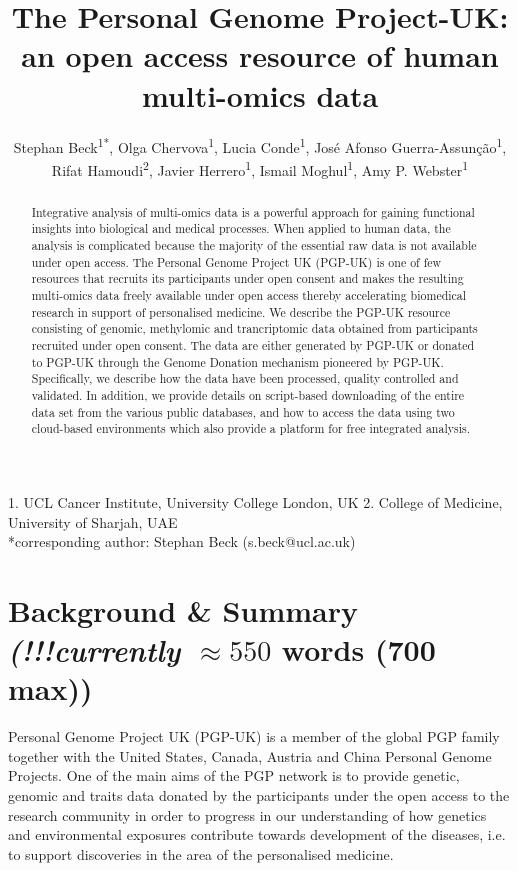 \documentclass[english]{article}
\begin{document}
\title{The Personal Genome Project-UK: an open access resource of human multi-omics data}
\author{Stephan Beck\textsuperscript{1{*}}, Olga Chervova\textsuperscript{1}, Lucia Conde\textsuperscript{1},
José Afonso Guerra-Assunção\textsuperscript{1},\\ Rifat Hamoudi\textsuperscript{2}, Javier Herrero\textsuperscript{1}, Ismail Moghul\textsuperscript{1}, Amy P. Webster\textsuperscript{1}}
\maketitle
\thispagestyle{fancy}
1. UCL Cancer Institute, University College London, UK 2. College of Medicine, University of Sharjah, UAE\\
{*}corresponding author: Stephan Beck (s.beck@ucl.ac.uk)
\begin{abstract}
Integrative analysis of multi-omics data is a powerful approach for gaining functional insights into biological and medical processes. When applied to human data, the analysis is complicated because the majority of the essential raw data is not available under open access. The Personal Genome Project UK (PGP-UK) is one of few resources that recruits its participants under open consent and makes the resulting multi-omics data freely available under open access thereby accelerating biomedical research in support of personalised medicine. We describe the PGP-UK resource consisting of genomic, methylomic and trancriptomic data obtained from participants recruited under open consent. The data are either generated by PGP-UK or donated to PGP-UK through the Genome Donation mechanism pioneered by PGP-UK. Specifically, we describe how the data have been processed, quality controlled and validated. In addition, we provide details on script-based downloading of the entire data set from the various public databases, and how to access the data using two cloud-based environments which also provide a platform for free integrated analysis.
\end{abstract}

\section*{Background \& Summary \small\textit{(!!!currently $\approx550$} words (700 max))}

Personal Genome Project UK (PGP-UK) is a member of the global PGP family together with the United States, Canada, Austria and China Personal Genome Projects. One of the main aims of the PGP network is to provide genetic, genomic and traits data donated by the participants under the open access to the research community in order to progress in our understanding of how genetics and environmental exposures contribute towards development of the diseases, i.e. to support discoveries in the area of the personalised medicine.
\end{document}

